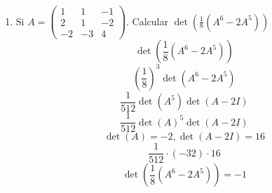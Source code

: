 \documentclass[../practica.root.tex]{subfiles}
\begin{document}
\begin{enumerate}
    \item Si \(A = \begin{pmatrix}
              1  & 1  & -1 \\
              2  & 1  & -2 \\
              -2 & -3 & 4
          \end{pmatrix}\). Calcular \( \det\left(\frac{1}{8}(A^6 - 2A^5)\right) \)
          \[ \det\left(\frac{1}{8}(A^6 - 2A^5)\right) \]
          \[ (\frac{1}{8})^3\det(A^6 - 2A^5) \]
          \[ \frac{1}{512}\det(A^5)\det(A - 2I) \]
          \[ \frac{1}{512}\det(A)^5\det(A - 2I) \]
          \[
              \det(A) = -2, \det(A - 2I) = 16
          \]
          \[ \frac{1}{512}\cdot(-32)\cdot 16 \]
          \[ \boxed{\det\left(\frac{1}{8}(A^6 - 2A^5)\right) = -1} \]

\end{enumerate}
\end{document}
